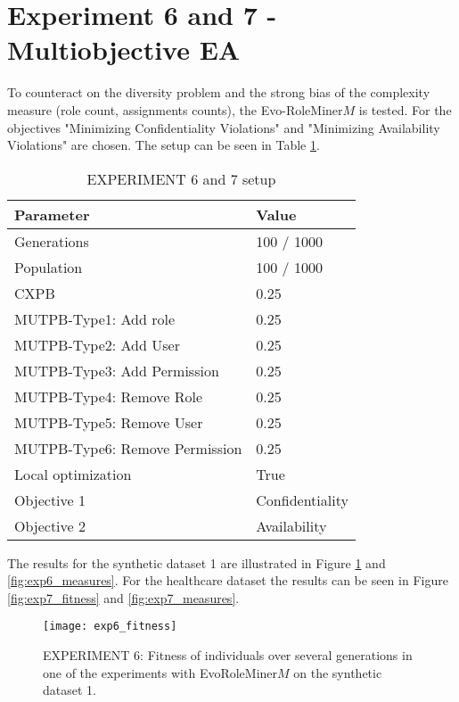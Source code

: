 \newpage
\section{Experiment 6 and 7 - Multiobjective EA}
\label{sec:exp7and7}
To counteract on the diversity problem and the strong bias of the complexity measure (role count, assignments counts), the Evo-RoleMiner$M$ is tested. For the objectives "Minimizing Confidentiality Violations" and "Minimizing Availability Violations" are chosen. The setup can be seen in Table \ref{tab:setup4}.

\begin{table}[H]
	\centering
	\begin{tabular}{|l|l|}
		\hline
		\rowcolor{myGray} 
		\textbf{Parameter}              & \textbf{Value}    \\ \hline
		Generations                     & 100 / 1000       	\\ \hline
		Population                      & 100 / 1000        \\ \hline
		CXPB                            & 0.25              \\ \hline
		MUTPB-Type1: Add role           & 0.25              \\ \hline
		MUTPB-Type2: Add User           & 0.25              \\ \hline
		MUTPB-Type3: Add Permission     & 0.25              \\ \hline
		MUTPB-Type4: Remove Role        & 0.25              \\ \hline
		MUTPB-Type5: Remove User        & 0.25              \\ \hline
		MUTPB-Type6: Remove Permission  & 0.25              \\ \hline
		Local optimization              & True        		\\ \hline
		Objective 1					    & Confidentiality   \\ \hline
		Objective 2					    & Availability     	\\ \hline
	\end{tabular}
	\caption{EXPERIMENT 6 and 7 setup}
	\label{tab:setup4}
\end{table}

The results for the synthetic dataset 1 are illustrated in Figure \ref{fig:exp6_fitness} and \ref{fig:exp6_measures}. For the healthcare dataset the results can be seen in Figure \ref{fig:exp7_fitness} and \ref{fig:exp7_measures}.

\begin{figure}[H]
	\centering
	\texttt{[image: exp6\_fitness]}
	\caption{EXPERIMENT 6: Fitness of individuals over several generations in one of the experiments with EvoRoleMiner$M$ on the synthetic dataset 1.}
	\label{fig:exp6_fitness}
\end{figure}

